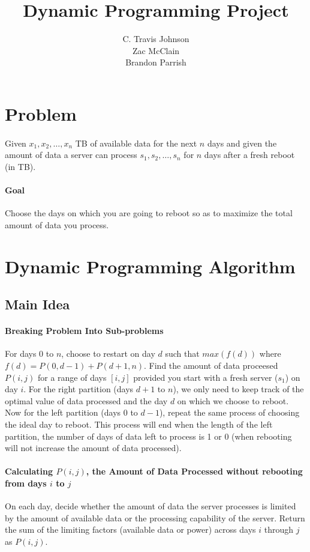 \documentclass[12pt]{article}
\author{C. Travis Johnson \\ Zac McClain \\ Brandon Parrish}
\title{Dynamic Programming Project}
\begin{document}
\maketitle
\section{Problem}
\paragraph{}
Given $x_1, x_2, \dots, x_n$ TB of available data for the next $n$ days and given the amount of data a server can process $s_1, s_2, \dots, s_n$ for $n$ days after a fresh reboot (in TB).
\paragraph{Goal}
Choose the days on which you are going to reboot so as to maximize the total amount of data you process.
\section{Dynamic Programming Algorithm}
\subsection{Main Idea}
\paragraph{Breaking Problem Into Sub-problems}
For days $0$ to $n$, choose to restart on day $d$ such that $max(f(d))$ where $f(d) = P(0,d-1) + P(d+1,n)$.
Find the amount of data proceesed $P(i,j)$ for a range of days $[i, j]$ provided you start with a fresh server ($s_1$) on day $i$.
For the right partition (days $d+1$ to $n$), we only need to keep track of the optimal value of data processed and the day $d$ on which we choose to reboot.
Now for the left partition (days $0$ to $d-1$), repeat the same process of choosing the ideal day to reboot.
This process will end when the length of the left partition, the number of days of data left to process is 1 or 0 (when rebooting will not increase the amount of data processed).
\paragraph{Calculating $P(i, j)$, the Amount of Data Processed without rebooting from days $i$ to $j$}
On each day, decide whether the amount of data the server processes is limited by the amount of available data or the processing capability of the server. Return the sum of the limiting factors (available data or power) across days $i$ through $j$ as $P(i, j)$.
\end{document}
